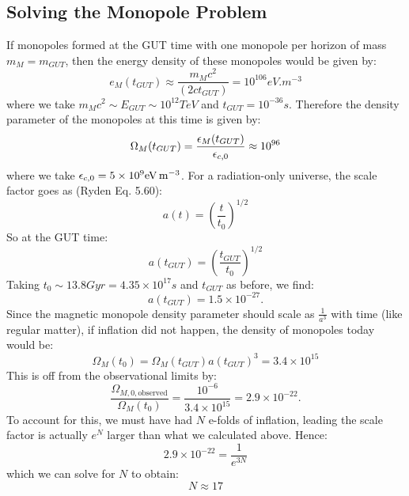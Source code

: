 \subsection{Solving the Monopole Problem}
If monopoles formed at the GUT time with one monopole per horizon of mass $m_M = m_{GUT}$, then the energy density of these monopoles would be given by:
\begin{equation}
    e_M(t_{GUT}) \approx \frac{m_Mc^2}{(2ct_{GUT})} = 10^{106}\si{eV.m^{-3}}
\end{equation}
where we take $m_Mc^2 \sim E_{GUT} \sim 10^{12}\si{TeV}$ and $t_{GUT} = 10^{-36}\si{s}$. Therefore the density parameter of the monopoles at this time is given by:
\begin{equation}
    \Omega_M(t_{GUT}) = \frac{\e_{M}(t_{GUT})}{\e_{c, 0}} \approx 10^{96}
\end{equation}
where we take $\e_{c, 0} = 5 \times 10^9\si{eV.m^{-3}}$. For a radiation-only universe, the scale factor goes as (Ryden Eq. 5.60):
\begin{equation}
    a(t) = \left(\frac{t}{t_0}\right)^{1/2}
\end{equation}
So at the GUT time:
\begin{equation}
    a(t_{GUT}) = \left(\frac{t_{GUT}}{t_0}\right)^{1/2}
\end{equation}
Taking $t_0 \sim 13.8\si{Gyr} = 4.35 \times 10^{17}\si{s}$ and $t_{GUT}$ as before, we find:
\begin{equation}
    a(t_{GUT}) = 1.5 \times 10^{-27}.
\end{equation}
Since the magnetic monopole density parameter should scale as $\frac{1}{a^3}$ with time (like regular matter), if inflation did not happen, the density of monopoles today would be:
\begin{equation}
    \Omega_M(t_0) = \Omega_M(t_{GUT})a(t_{GUT})^3 = 3.4 \times 10^{15}
\end{equation}
This is off from the observational limits by:
\begin{equation}
    \frac{\Omega_{M, 0, \text{observed}}}{\Omega_M(t_0)} = \frac{10^{-6}}{3.4 \times 10^{15}} = 2.9 \times 10^{-22}.
\end{equation}
To account for this, we must have had $N$ e-folds of inflation, leading the scale factor is actually $e^{N}$ larger than what we calculated above. Hence:
\begin{equation}
    2.9 \times 10^{-22} = \frac{1}{e^{3N}}
\end{equation}
which we can solve for $N$ to obtain:
\begin{equation}
    \boxed{N \approx 17}
\end{equation}


